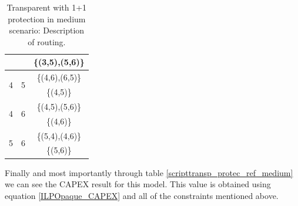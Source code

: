 \begin{table}[h!]
\begin{tabular}{|| c | c | c ||}
 & & \{(3,5),(5,6)\} \\ \hline
 \multirow{2}{*}{4} & \multirow{2}{*}{5} & \{(4,6),(6,5)\} \\
 & & \{(4,5)\} \\ \hline
 \multirow{2}{*}{4} & \multirow{2}{*}{6} & \{(4,5),(5,6)\} \\
 & & \{(4,6)\} \\ \hline
 \multirow{2}{*}{5} & \multirow{2}{*}{6} & \{(5,4),(4,6)\} \\
 & & \{(5,6)\} \\
 \hline
\end{tabular}
\caption{Transparent with 1+1 protection in medium scenario: Description of routing.}
\label{path_transp_protec_ref_medium}
\end{table}

Finally and most importantly through table \ref{scripttransp_protec_ref_medium} we can see the CAPEX result for this model. This value is obtained using equation \ref{ILPOpaque_CAPEX} and all of the constraints mentioned above.\\
\newpage
